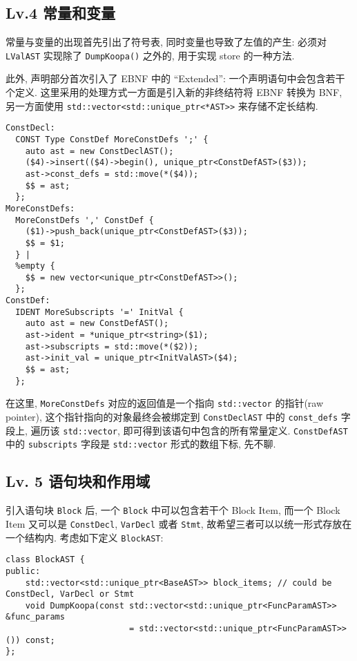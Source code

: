 \documentclass[8pt]{article}
\theoremstyle{compact}
\begin{document}
\subsection{Lv.4 常量和变量}

常量与变量的出现首先引出了符号表, 同时变量也导致了左值的产生: 必须对 \texttt{LValAST} 实现除了 \texttt{DumpKoopa()} 之外的, 用于实现 store 的一种方法. 

此外, 声明部分首次引入了 EBNF 中的 “Extended”: 一个声明语句中会包含若干个定义. 这里采用的处理方式一方面是引入新的非终结符将 EBNF 转换为 BNF, 另一方面使用 \texttt{std::vector<std::unique\_ptr<*AST>>} 来存储不定长结构.
\begin{verbatim}
ConstDecl:
  CONST Type ConstDef MoreConstDefs ';' {
    auto ast = new ConstDeclAST();
    ($4)->insert(($4)->begin(), unique_ptr<ConstDefAST>($3));
    ast->const_defs = std::move(*($4));
    $$ = ast;
  };
MoreConstDefs:
  MoreConstDefs ',' ConstDef {
    ($1)->push_back(unique_ptr<ConstDefAST>($3));
    $$ = $1;
  } | 
  %empty {
    $$ = new vector<unique_ptr<ConstDefAST>>();
  };
ConstDef:
  IDENT MoreSubscripts '=' InitVal {
    auto ast = new ConstDefAST();
    ast->ident = *unique_ptr<string>($1);
    ast->subscripts = std::move(*($2));
    ast->init_val = unique_ptr<InitValAST>($4);
    $$ = ast;
  };
\end{verbatim}

在这里, \texttt{MoreConstDefs} 对应的返回值是一个指向 \texttt{std::vector} 的指针(raw pointer), 这个指针指向的对象最终会被绑定到 \texttt{ConstDeclAST} 中的 \texttt{const\_defs} 字段上, 遍历该 \texttt{std::vector}, 即可得到该语句中包含的所有常量定义. \texttt{ConstDefAST} 中的 \texttt{subscripts} 字段是 \texttt{std::vector} 形式的数组下标, 先不聊.

\subsection{Lv. 5 语句块和作用域}

引入语句块 \texttt{Block} 后, 一个 \texttt{Block} 中可以包含若干个 Block Item, 而一个 Block Item 又可以是 \texttt{ConstDecl}, \texttt{VarDecl} 或者 \texttt{Stmt}, 故希望三者可以以统一形式存放在一个结构内. 考虑如下定义 \texttt{BlockAST}:
\begin{verbatim}
class BlockAST {
public:
    std::vector<std::unique_ptr<BaseAST>> block_items; // could be ConstDecl, VarDecl or Stmt
    void DumpKoopa(const std::vector<std::unique_ptr<FuncParamAST>> &func_params 
                         = std::vector<std::unique_ptr<FuncParamAST>>()) const;
};
\end{verbatim}
\end{document}
